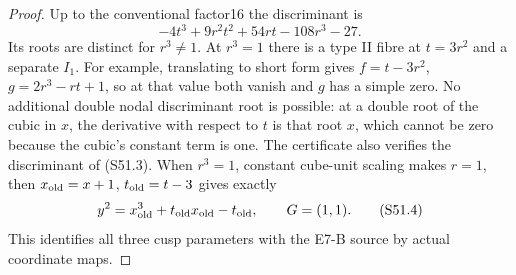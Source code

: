 \begin{proof}
Up to the conventional factor16 the discriminant is
\[
 -4t^3+9r^2t^2+54rt-108r^3-27.
 \tag{S51.3}
\]
Its roots are distinct for \(r^3\ne1\). At \(r^3=1\) there
is a type II fibre at \(t=3r^2\) and a separate \(I_1\).
For example, translating to short form gives
\(f=t-3r^2\), \(g=2r^3-rt+1\), so at that value both vanish
and \(g\) has a simple zero. No additional double nodal
discriminant root is possible: at a double root of the cubic
in \(x\), the derivative with respect to \(t\) is that root
\(x\), which cannot be zero because the cubic's constant
term is one. The certificate also verifies the discriminant
of (S51.3). When \(r^3=1\), constant cube-unit scaling makes
\(r=1\), then \(x_{\rm old}=x+1\),
\(t_{\rm old}=t-3\) gives exactly
\[
             y^2=x_{\rm old}^3+t_{\rm old}x_{\rm old}
                       -t_{\rm old},\qquad G=(1,1).
 \tag{S51.4}
\]
This identifies all three cusp parameters with the E7-B
source by actual coordinate maps.


\end{proof}
